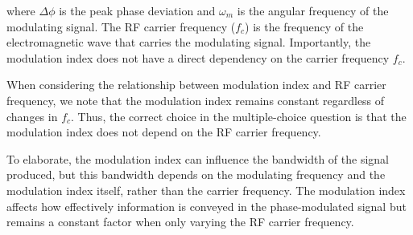 where \( \Delta \phi \) is the peak phase deviation and \( \omega_m \) is the angular frequency of the modulating signal. The RF carrier frequency (\( f_c \)) is the frequency of the electromagnetic wave that carries the modulating signal. Importantly, the modulation index does not have a direct dependency on the carrier frequency \( f_c \). 

When considering the relationship between modulation index and RF carrier frequency, we note that the modulation index remains constant regardless of changes in \( f_c \). Thus, the correct choice in the multiple-choice question is that the modulation index does not depend on the RF carrier frequency.

To elaborate, the modulation index can influence the bandwidth of the signal produced, but this bandwidth depends on the modulating frequency and the modulation index itself, rather than the carrier frequency. The modulation index affects how effectively information is conveyed in the phase-modulated signal but remains a constant factor when only varying the RF carrier frequency.

